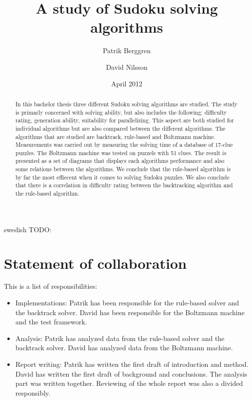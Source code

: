 \documentclass[a4paper,11pt]{kth-mag}
\title{A study of Sudoku solving algorithms}
\subtitle{}
\author{Patrik Berggren \and David Nilsson}
\date{April 2012}
\begin{document}
\frontmatter
\pagestyle{empty}
\removepagenumbers
\maketitle
{}
\begin{abstract}
In this bachelor thesis three different Sudoku solving algorithms are studied.
The study is primarly concerned with solving ability, but also includes the following: difficulty rating, generation ability, suitability for parallelizing.
This aspect are both studied for individual algorithms but are also compared between the different algorithms.
The algorithms that are studied are backtrack, rule-based and Boltzmann machine.
Measurements was carried out by measuring the solving time of a database of 17-clue puzzles. The Boltzmann machine was tested on puzzels with 51 clues.
The result is presented as a set of diagrams that displays each algorithms performance and also some relations between the algorithms. 
We conclude that the rule-based algorithm is by far the most effiecent when it comes to solving Sudoku puzzles.
We also conclude that there is a correlation in difficulty rating between the backtracking algorithm and the rule-based algorithm.

\end{abstract}
\clearpage
\begin{foreignabstract}{swedish}
TODO: 
\end{foreignabstract}
\clearpage
\section{Statement of collaboration}
This is a list of responsibilities:
\begin{itemize}
    \item Implementations: Patrik has been responsible for the rule-based solver and the backtrack solver. David has been responsible for the Boltzmann machine and the test framework.
    \item Analysis: Patrik has analyzed data from the rule-based solver and the backtrack solver. David has analyzed data from the Boltzmann machine.
    \item Report writing: Patrik has written the first draft of introduction and method. David has written the first draft of background and conclusions. The analysis part was written together. Reviewing of the whole report was also a divided responsibly.
\end{itemize}
\end{document}
